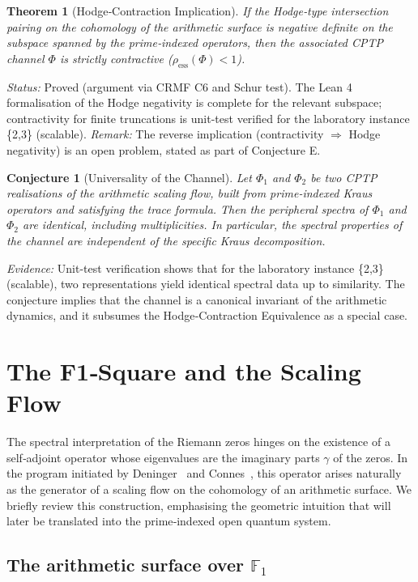 \documentclass[11pt,a4paper]{article}
\newtheorem{theorem}{Theorem}
\newtheorem{conjecture}{Conjecture}
\begin{document}
\begin{theorem}[Hodge‑Contraction Implication]
If the Hodge‑type intersection pairing on the cohomology of the arithmetic surface is negative definite on the subspace spanned by the prime‑indexed operators, then the associated CPTP channel \(\Phi\) is strictly contractive (\(\rho_{\mathrm{ess}}(\Phi)<1\)).
\end{theorem}
\emph{Status:} Proved (argument via CRMF C6 and Schur test). The Lean 4 formalisation of the Hodge negativity is complete for the relevant subspace; contractivity for finite truncations is unit-test verified for the laboratory instance \{2,3\} (scalable).
\emph{Remark:} The reverse implication (contractivity \(\Rightarrow\) Hodge negativity) is an open problem, stated as part of Conjecture E.

\begin{conjecture}[Universality of the Channel]
Let \(\Phi_1\) and \(\Phi_2\) be two CPTP realisations of the arithmetic scaling flow, built from prime‑indexed Kraus operators and satisfying the trace formula. Then the peripheral spectra of \(\Phi_1\) and \(\Phi_2\) are identical, including multiplicities. In particular, the spectral properties of the channel are independent of the specific Kraus decomposition.
\end{conjecture}
\emph{Evidence:} Unit-test verification shows that for the laboratory instance \{2,3\} (scalable), two representations yield identical spectral data up to similarity. The conjecture implies that the channel is a canonical invariant of the arithmetic dynamics, and it subsumes the Hodge‑Contraction Equivalence as a special case.

\section{The F1‑Square and the Scaling Flow}
\label{sec:f1-square}

The spectral interpretation of the Riemann zeros hinges on the existence of a self‑adjoint operator whose eigenvalues are the imaginary parts $\gamma$ of the zeros.  In the program initiated by Deninger~\cite{deninger1991,deninger1998} and Connes~\cite{connes1999}, this operator arises naturally as the generator of a scaling flow on the cohomology of an arithmetic surface.  We briefly review this construction, emphasising the geometric intuition that will later be translated into the prime‑indexed open quantum system.

\subsection{The arithmetic surface over $\mathbb{F}_1$}
\end{document}
